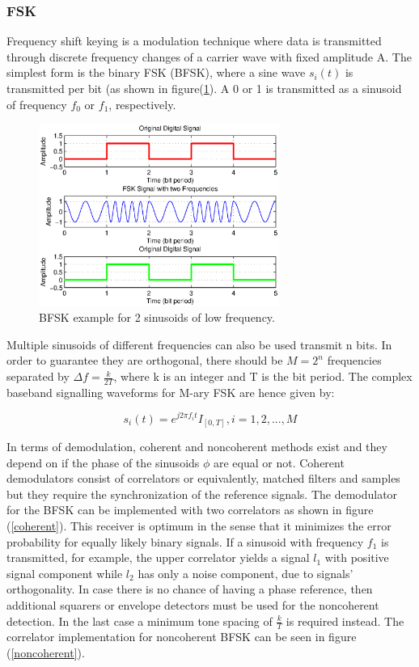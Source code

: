 \documentclass[12pt,a4paper,openright]{article}
\begin{document}
\subsubsection{FSK}
\label{fsk}
Frequency shift keying is a modulation technique where data is transmitted through discrete frequency changes of a carrier wave with fixed amplitude A. The simplest form is the binary FSK (BFSK), where a sine wave $s_i(t)$ is transmitted per bit (as shown in figure(\ref{fskex}). A 0 or 1 is transmitted as a sinusoid of frequency $f_0$ or $f_1$, respectively. 

\begin{figure}[h]
  \centering
    \includegraphics[width=0.7\textwidth]{fskexample.eps}
    \caption{BFSK example for 2 sinusoids of low frequency.}
    \label{fskex}
\end{figure}

Multiple sinusoids of different frequencies can also be used  transmit n bits. In order to guarantee they are orthogonal, there should be $M=2^n$ frequencies separated by $\Delta f=\frac{k}{2T}$, where k is an integer and T is the bit period. The complex baseband signalling waveforms for M-ary FSK are hence given by:

\[{s_i}(t) = {e^{j2\pi {f_i}t}}{I_{[0,T]}},i = 1,2,...,M\]



In terms of demodulation, coherent and noncoherent methods exist and they depend on if the phase of the sinusoids $\phi$ are equal or not. Coherent demodulators consist of correlators or equivalently, matched filters and samples but they require the synchronization of the reference signals. The demodulator for the BFSK can be implemented with two correlators as shown in figure (\ref{coherent}). This receiver is optimum in the sense that it minimizes the error probability for equally likely binary signals. If a sinusoid with frequency $f_1$ is transmitted, for example, the upper correlator yields a signal $l_1$ with positive signal component while $l_2$ has only a noise component, due to signals’ orthogonality.
  In case there is no chance of having a phase reference, then additional squarers or envelope detectors must be used for the noncoherent detection. In the last case a minimum tone spacing of $\frac{k}{T}$ is required instead. The correlator implementation for noncoherent BFSK can be seen in figure (\ref{noncoherent}).
\end{document}
